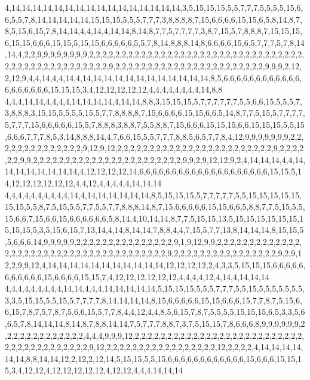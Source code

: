 4,14,14,14,14,14,14,14,14,14,14,14,14,14,14,14,14,3,5,15,15,15,5,5,7,7,7,5,5,5,5,15,6,6,5,5,7,8,14,14,14,14,14,15,15,15,5,5,5,7,7,7,3,8,8,8,8,7,15,6,6,6,6,15,15,6,5,8,14,8,7,8,5,15,6,15,7,8,14,14,4,4,14,4,14,14,8,14,8,7,7,5,7,7,7,7,3,8,7,15,5,7,8,8,8,7,15,15,15,6,15,15,6,6,6,15,15,5,15,15,6,6,6,6,6,5,5,7,8,14,8,8,8,14,8,6,6,6,6,15,6,5,7,7,7,5,7,8,14,14,4,2,2,9,9,9,9,9,9,9,9,2,2,2,2,2,2,2,2,2,2,2,2,2,2,2,2,2,2,2,2,2,2,2,2,2,2,2,2,2,2,2,2,2,2,2,2,2,2,2,2,2,2,2,2,2,2,2,2,2,9,2,2,2,2,2,2,2,2,2,2,2,2,2,2,2,2,2,2,2,2,2,2,2,9,9,9,2,12,2,12,9,4,4,14,4,4,14,4,14,14,14,14,14,14,14,14,14,14,14,14,8,5,6,6,6,6,6,6,6,6,6,6,6,6,6,6,6,6,6,6,6,15,15,15,3,4,12,12,12,12,12,4,4,4,4,4,4,4,4,14,8,8
4,4,4,14,14,4,4,4,4,14,14,14,14,4,14,14,8,8,3,15,15,15,5,7,7,7,7,7,7,5,5,6,6,15,5,5,5,7,3,8,8,8,3,15,15,5,5,5,5,15,5,7,7,8,8,8,8,7,15,6,6,6,6,15,15,6,6,5,14,8,7,7,5,15,5,7,7,7,7,5,7,7,7,15,6,6,6,6,6,15,5,7,8,8,8,3,8,8,7,5,5,8,8,7,15,6,6,6,15,15,15,6,6,15,15,15,5,5,15,6,6,6,7,7,7,8,5,3,14,8,8,8,14,4,7,6,6,15,5,5,7,7,7,8,8,5,6,5,7,7,8,4,12,9,9,9,9,9,9,9,2,2,2,2,2,2,2,2,2,2,2,2,2,2,9,12,9,12,2,2,2,2,2,2,2,2,2,2,2,2,2,2,2,2,2,2,2,2,2,2,2,2,9,2,2,2,2,2,2,9,9,2,2,2,2,2,2,2,2,2,2,2,2,2,2,2,2,2,2,2,2,2,2,2,9,9,2,9,12,12,9,2,4,14,14,14,4,4,14,14,14,14,14,14,14,14,4,12,12,12,12,14,6,6,6,6,6,6,6,6,6,6,6,6,6,6,6,6,6,6,6,6,15,15,5,14,12,12,12,12,12,12,4,4,12,4,4,4,4,4,14,14,14
4,4,4,4,4,4,4,4,4,4,14,4,14,14,14,14,14,14,8,5,15,15,15,5,7,7,7,7,7,5,5,15,15,15,15,15,15,15,5,5,8,7,5,15,5,5,7,7,5,5,7,7,8,8,8,14,8,7,15,6,6,6,6,6,15,15,6,6,5,8,8,7,7,5,15,5,5,15,6,6,7,15,6,6,15,6,6,6,6,6,6,5,8,14,4,10,14,14,8,7,7,5,15,15,13,5,15,15,15,15,15,15,15,15,15,5,3,5,15,6,15,7,13,14,4,14,8,14,14,7,8,8,4,4,7,15,5,7,7,13,8,14,14,14,8,15,15,5,5,6,6,6,14,9,9,9,9,9,2,2,2,2,2,2,2,2,2,2,2,2,2,2,2,9,1,9,12,9,9,2,2,2,2,2,2,2,2,2,2,2,2,2,2,2,2,2,2,2,2,2,2,2,2,2,2,2,2,2,2,2,2,2,2,2,2,2,2,9,2,2,2,2,2,2,2,2,2,2,2,2,2,2,2,2,9,2,9,12,2,9,9,12,4,14,14,14,14,14,14,14,14,14,14,14,12,12,12,12,2,4,3,3,5,15,15,15,6,6,6,6,6,6,6,6,6,6,6,15,6,6,6,6,15,15,7,4,12,12,12,12,12,12,4,4,4,4,12,4,14,4,14,14,14
4,4,4,4,4,4,4,4,4,14,14,4,4,4,14,14,14,14,14,5,15,15,15,5,5,5,7,7,7,5,5,15,5,5,5,5,5,5,5,3,3,5,15,15,5,5,15,5,7,7,7,7,8,14,14,14,14,8,15,6,6,6,6,6,15,15,6,6,6,15,7,7,8,7,5,15,6,6,15,7,8,7,5,7,8,7,5,6,6,15,5,7,7,8,4,4,12,4,4,8,5,6,15,7,8,7,5,5,5,5,15,15,15,6,5,3,3,5,6,6,5,7,8,14,14,14,8,14,8,7,8,8,14,14,7,5,7,7,7,8,8,7,3,7,5,15,15,7,8,6,6,6,8,9,9,9,9,9,9,2,2,2,2,2,2,2,2,2,2,2,2,2,4,4,4,9,9,9,12,2,2,2,2,2,2,2,2,2,2,2,2,2,2,2,2,2,2,2,2,2,2,2,2,2,2,2,2,2,2,2,2,2,2,2,2,2,2,2,9,12,2,2,2,2,2,2,2,2,2,2,2,2,2,2,2,2,2,12,2,2,2,2,4,14,14,14,14,14,14,8,8,14,14,12,2,12,2,12,14,5,15,15,5,5,15,6,6,6,6,6,6,6,6,6,6,6,6,15,6,6,6,15,15,15,3,4,12,12,4,12,12,12,12,12,4,12,12,4,4,4,14,14,14

